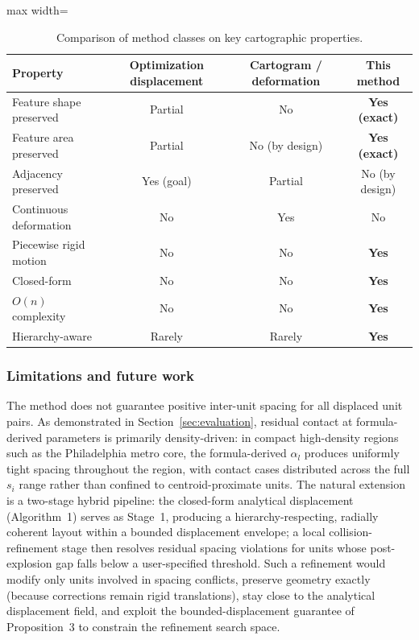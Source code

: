 \documentclass[12pt, a4paper]{article}
\numberwithin{equation}{section}
\begin{document}
\begin{table}[h]
\centering
\caption{Comparison of method classes on key cartographic properties.}
\label{tab:comparison}
\begin{adjustbox}{max width=\textwidth}
\begin{tabular}{lccc}
\toprule
\textbf{Property} & \textbf{Optimization displacement} & \textbf{Cartogram / deformation} & \textbf{This method} \\
\midrule
Feature shape preserved   & Partial        & No             & \textbf{Yes (exact)} \\
Feature area preserved    & Partial        & No (by design) & \textbf{Yes (exact)} \\
Adjacency preserved       & Yes (goal)     & Partial        & No (by design) \\
Continuous deformation    & No             & Yes            & No \\
Piecewise rigid motion    & No             & No             & \textbf{Yes} \\
Closed-form               & No             & No             & \textbf{Yes} \\
$O(n)$ complexity         & No             & No             & \textbf{Yes} \\
Hierarchy-aware           & Rarely         & Rarely         & \textbf{Yes} \\
\bottomrule
\end{tabular}
\end{adjustbox}
\end{table}

\subsubsection*{Limitations and future work}

The method does not guarantee positive inter-unit spacing for all displaced unit pairs. As demonstrated in Section~\ref{sec:evaluation}, residual contact at formula-derived parameters is primarily density-driven: in compact high-density regions such as the Philadelphia metro core, the formula-derived $\alpha_l$ produces uniformly tight spacing throughout the region, with contact cases distributed across the full $s_i$ range rather than confined to centroid-proximate units. The natural extension is a two-stage hybrid pipeline: the closed-form analytical displacement (Algorithm~1) serves as Stage~1, producing a hierarchy-respecting, radially coherent layout within a bounded displacement envelope; a local collision-refinement stage then resolves residual spacing violations for units whose post-explosion gap falls below a user-specified threshold. Such a refinement would modify only units involved in spacing conflicts, preserve geometry exactly (because corrections remain rigid translations), stay close to the analytical displacement field, and exploit the bounded-displacement guarantee of Proposition~3 to constrain the refinement search space.
\end{document}
